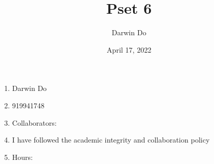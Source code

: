 \documentclass{article}
\title{Pset 6}
\begin{document}
\newcommand{\Not}{\textbf{not}}
\newcommand{\AAnd}{\textbf{and}}
\newcommand{\Or}{\textbf{or}}
\newcommand{\True}{\texttt{True} }
\newcommand{\False}{\texttt{False} }

\date{April 17, 2022 }
\author{Darwin Do}

\maketitle

\begin{enumerate}
    \item Darwin Do
    \item 919941748
    \item Collaborators: 
    \item I have followed the academic integrity and collaboration policy
    \item Hours: 
\end{enumerate}

\newpage
\end{document}
